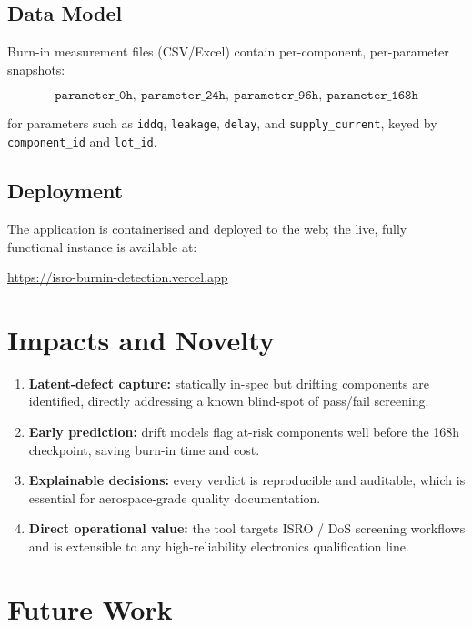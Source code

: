 \documentclass[11pt,a4paper]{article}
\begin{document}
\subsection{Data Model}
Burn-in measurement files (CSV/Excel) contain per-component, per-parameter snapshots:

\[
\texttt{parameter\_0h},\ \texttt{parameter\_24h},\ \texttt{parameter\_96h},\ \texttt{parameter\_168h}
\]

for parameters such as \texttt{iddq}, \texttt{leakage}, \texttt{delay}, and
\texttt{supply\_current}, keyed by \texttt{component\_id} and \texttt{lot\_id}.

\subsection{Deployment}
The application is containerised and deployed to the web; the live, fully functional instance is
available at:

\begin{center}
\url{https://isro-burnin-detection.vercel.app}
\end{center}

\section{Impacts and Novelty}
\label{sec:impact}

\begin{enumerate}[leftmargin=1.5em]
  \item \textbf{Latent-defect capture:} statically in-spec but drifting components are identified,
        directly addressing a known blind-spot of pass/fail screening.
  \item \textbf{Early prediction:} drift models flag at-risk components well before the 168h
        checkpoint, saving burn-in time and cost.
  \item \textbf{Explainable decisions:} every verdict is reproducible and auditable, which is
        essential for aerospace-grade quality documentation.
  \item \textbf{Direct operational value:} the tool targets ISRO / DoS screening workflows and is
        extensible to any high-reliability electronics qualification line.
\end{enumerate}

\section{Future Work}
\label{sec:future}
\end{document}
